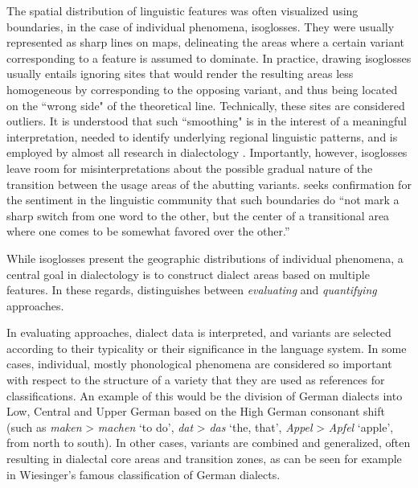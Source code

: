 \documentclass[output=paper]{langscibook}
\begin{document}
The spatial distribution of linguistic features was often visualized using boundaries, in the case of individual phenomena,  isoglosses. They were usually represented as sharp lines on maps, delineating the areas where a certain variant corresponding to a feature is assumed to dominate. In practice, drawing isoglosses usually entails ignoring sites that would render the resulting areas less homogeneous by corresponding to the opposing variant, and thus being located on the ``wrong side" of the theoretical line. Technically, these sites are considered outliers. It is understood that such ``smoothing" is in the interest of a meaningful interpretation, needed to identify underlying regional linguistic patterns, and is employed by almost all research in dialectology \parencite[82]{Grieve2014}. Importantly, however, isoglosses leave room for misinterpretations about the possible gradual nature of the transition between the usage areas of the abutting variants. \textcite[][5]{Francis1983} seeks confirmation for the sentiment in the linguistic community that such boundaries do “not mark a sharp switch from one word to the other, but the center of a transitional area where one comes to be somewhat favored over the other.”

While isoglosses present the geographic distributions of individual phenomena, a central goal in dialectology is to construct dialect areas based on multiple features. In these regards, \textcite[191--198]{Lameli2019} distinguishes between \textit{evaluating} and \textit{quantifying} approaches. 

In evaluating approaches, dialect data is interpreted, and variants are selected according to their typicality or their significance in the language system. In some cases, individual, mostly phonological phenomena are considered so important with respect to the structure of a variety that they are used as references for classifications. An example of this would be the division of German dialects into Low, Central and Upper German based on the High German consonant shift (such as \textit{maken} > \textit{machen} `to do', \textit{dat} > \textit{das} `the, that', \textit{Appel} > \textit{Apfel} `apple', from north to south). In other cases, variants are combined and generalized, often resulting in dialectal core areas and transition zones, as can be seen for example in Wiesinger's \parencite*{Wiesinger1983} famous classification of German dialects. 
\end{document}
